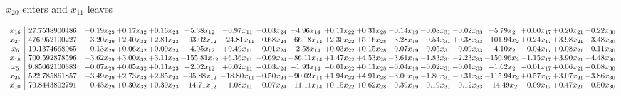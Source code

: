 \documentclass[9pt]{article}
\begin{document}
 $ x_{20} $ enters and $ x_{11} $ leaves 

 \[\begin{array}{c| c c@{\hskip 2pt} c@{\hskip 2pt} c@{\hskip 2pt} c@{\hskip 2pt} c@{\hskip 2pt} c@{\hskip 2pt} c@{\hskip 2pt} c@{\hskip 2pt} c@{\hskip 2pt} c@{\hskip 2pt} c@{\hskip 2pt} c@{\hskip 2pt} c@{\hskip 2pt} c@{\hskip 2pt} c@{\hskip 2pt} c@{\hskip 2pt} }
 x_{16}   &  27.7538900486 & -0.19 x_{29} & +  0.17 x_{32} & +  0.16 x_{23} & -5.38 x_{12} & -0.97 x_{11} & -0.03 x_{24} & -4.96 x_{14} & +  0.11 x_{22} & +  0.31 x_{28} & -0.14 x_{19} & -0.08 x_{31} & -0.02 x_{33} & -5.79 x_{2} & +  0.00 x_{17} & +  0.20 x_{21} & -0.22 x_{30}\\
 x_{27}   &  476.952100227 & -3.20 x_{29} & +  2.40 x_{32} & +  2.81 x_{23} & -93.02 x_{12} & -24.81 x_{11} & -0.68 x_{24} & -66.18 x_{14} & +  2.30 x_{22} & +  5.16 x_{28} & -3.28 x_{19} & -0.54 x_{31} & +  0.38 x_{33} & -101.94 x_{2} & +  0.24 x_{17} & +  3.98 x_{21} & -3.48 x_{30}\\
 x_{6}   &  19.1374668065 & -0.13 x_{29} & +  0.06 x_{32} & +  0.09 x_{23} & -4.05 x_{12} & +  0.49 x_{11} & -0.01 x_{24} & -2.58 x_{14} & +  0.03 x_{22} & +  0.15 x_{28} & -0.07 x_{19} & -0.05 x_{31} & -0.09 x_{33} & -4.10 x_{2} & -0.04 x_{17} & +  0.08 x_{21} & -0.11 x_{30}\\
 x_{18}   &  700.592878596 & -3.62 x_{29} & +  3.00 x_{32} & +  3.11 x_{23} & -155.81 x_{12} & +  6.36 x_{11} & -0.69 x_{24} & -86.11 x_{14} & +  1.47 x_{22} & +  4.53 x_{28} & -3.61 x_{19} & -1.83 x_{31} & -2.23 x_{33} & -150.96 x_{2} & -1.15 x_{17} & +  3.90 x_{21} & -4.48 x_{30}\\
 x_{5}   &  9.85062100383 & -0.07 x_{29} & +  0.05 x_{32} & +  0.11 x_{23} & -2.02 x_{12} & +  0.02 x_{11} & -0.03 x_{24} & -1.93 x_{14} & -0.01 x_{22} & +  0.11 x_{28} & -0.04 x_{19} & -0.02 x_{31} & -0.01 x_{33} & -1.62 x_{2} & -0.01 x_{17} & +  0.06 x_{21} & -0.08 x_{30}\\
 x_{25}   &  522.785861857 & -3.49 x_{29} & +  2.73 x_{32} & +  2.85 x_{23} & -95.88 x_{12} & -18.80 x_{11} & -0.50 x_{24} & -90.02 x_{14} & +  1.94 x_{22} & +  4.91 x_{28} & -3.00 x_{19} & -1.80 x_{31} & -0.31 x_{33} & -115.94 x_{2} & +  0.57 x_{17} & +  3.07 x_{21} & -3.86 x_{30}\\
 x_{10}   &  70.8443802791 & -0.43 x_{29} & +  0.30 x_{32} & +  0.39 x_{23} & -14.71 x_{12} & -1.08 x_{11} & -0.07 x_{24} & -11.11 x_{14} & +  0.15 x_{22} & +  0.62 x_{28} & -0.39 x_{19} & -0.19 x_{31} & -0.12 x_{33} & -14.49 x_{2} & -0.09 x_{17} & +  0.47 x_{21} & -0.50 x_{30}\\

\end{array}\]
\end{document}
